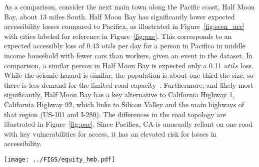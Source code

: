 As a comparison, consider the next main town along the Pacific coast, Half Moon Bay, about 13 miles South. Half Moon Bay has significantly lower expected accessibility losses compared to Pacifica, as illustrated in Figure~\ref{fig:scen_acc} with cities labeled for reference in Figure~\ref{fig:pac}. 
This corresponds to an expected accessibly loss of 0.43 $utils$ per day for a person in Pacifica in middle income household with fewer cars than workers, given an event in the dataset. In comparison, a similar person in Half Moon Bay is expected only a 0.11 $utils$ loss.
While the seismic hazard is similar, the population is about one third the size, so there is less demand for the limited road capacity~\cite{u.s._bureau_of_the_census_united_2010}. Furthermore, and likely most significantly, Half Moon Bay has a key alternative to California Highway 1, California Highway 92, which links to Silicon Valley and the main highways of that region (US-101 and I-280). The differences in the road topology are illustrated in Figure~\ref{fig:pac}. Since Pacifica, CA is unusually reliant on one road with key vulnerabilities for access, it has an elevated risk for losses in accessibility.




\begin{figure*}[t]
    \centering
    \texttt{[image: ../FIGS/equity\_hmb.pdf]} 
\caption{Differences in road access: limited roads in and out of Pacifica, CA, but an extra access highway for Half Moon Bay, CA.}
\label{fig:pac}
\end{figure*}

